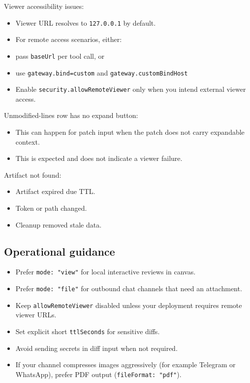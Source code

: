 Viewer accessibility issues:

\begin{itemize}
  \item Viewer URL resolves to \texttt{127.0.0.1} by default.
  \item For remote access scenarios, either:
  \item pass \texttt{baseUrl} per tool call, or
  \item use \texttt{gateway.bind=custom} and \texttt{gateway.customBindHost}
  \item Enable \texttt{security.allowRemoteViewer} only when you intend external viewer access.
\end{itemize}


Unmodified-lines row has no expand button:

\begin{itemize}
  \item This can happen for patch input when the patch does not carry expandable context.
  \item This is expected and does not indicate a viewer failure.
\end{itemize}


Artifact not found:

\begin{itemize}
  \item Artifact expired due TTL.
  \item Token or path changed.
  \item Cleanup removed stale data.
\end{itemize}


\subsection{Operational guidance}


\begin{itemize}
  \item Prefer \texttt{mode: "view"} for local interactive reviews in canvas.
  \item Prefer \texttt{mode: "file"} for outbound chat channels that need an attachment.
  \item Keep \texttt{allowRemoteViewer} disabled unless your deployment requires remote viewer URLs.
  \item Set explicit short \texttt{ttlSeconds} for sensitive diffs.
  \item Avoid sending secrets in diff input when not required.
  \item If your channel compresses images aggressively (for example Telegram or WhatsApp), prefer PDF output (\texttt{fileFormat: "pdf"}).
\end{itemize}


